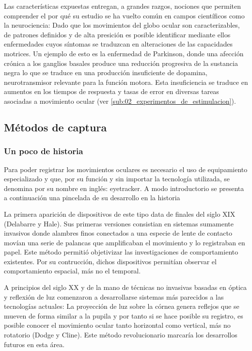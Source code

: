 \documentclass[../main.tex]{subfiles}
\begin{document}
		Las características expuestas entregan, a grandes razgos, nociones que permiten comprender el por qué su estudio se ha vuelto común en campos científicos como la neurociencia: Dado que los movimientos del globo ocular son caracterizables, de patrones definidos y de alta presición es posible identificar mediante ellos enfermedades cuyos síntomas se traduzcan en alteraciones de las capacidades motrices. Un ejemplo de esto es la enfermedad de Parkinson, donde una afección crónica a los ganglios basales produce una reducción progresiva de la sustancia negra lo que se traduce en una producción insuficiente de dopamina, neurotransmisor relevante para la función motora. Esta insuficiencia se traduce en aumentos en los tiempos de respuesta y tasas de error en diversas tareas asociadas a movimiento ocular \cite{article:tests_1, article:tests_2, article:tests_3, article:tests_4} (ver \ref{sub:02_experimentos_de_estimulacion}).    

		\newpage
		\subsection{Métodos de captura}
		\label{sub:02_metodos_de_captura}
			\subsubsection{Un poco de historia} 
			\label{ssub:02_un_poco_de_historia_monitores}
			
			Para poder registrar los movimientos oculares es necesario el uso de equipamiento especializado y que, por su función y sin importar la tecnología utilizada, se denomina por su nombre en inglés: \gls{eyetracker}. A modo introductorio se presenta a continuación una pincelada de su desarrollo en la historia \cite{article:eyetracker_eggert, article:eyetracker_richardson}

			La primera aparición de dispositivos de este tipo data de finales del siglo XIX (Delabarre y Hale). Sus primeras versiones consistian en sistemas sumamente invasivos donde alambres finos conectados a una especie de lente de contacto movían una serie de palancas que amplificaban el movimiento y lo registraban en papel. Este método permitió objetivizar las investigaciones de comportamiento existentes. Por su contrucción, dichos dispositivos permitían observar el comportamiento espacial, más no el temporal. 

			A principios del siglo XX y de la mano de técnicas no invasivas basadas en óptica y reflexión de luz comenzaron a desarrollarse sistemas más parecidos a las tecnologías actuales: La proyección de luz sobre la córnea genera reflejos que se mueven de forma similar a la pupila y por tanto si se hace posible su registro, es posible conocer el movimiento ocular tanto horizontal como vertical, más no rotatorio (Dodge y Cline). Este método revolucionario marcaría los desarrollos futuros en esta área.
\end{document}

